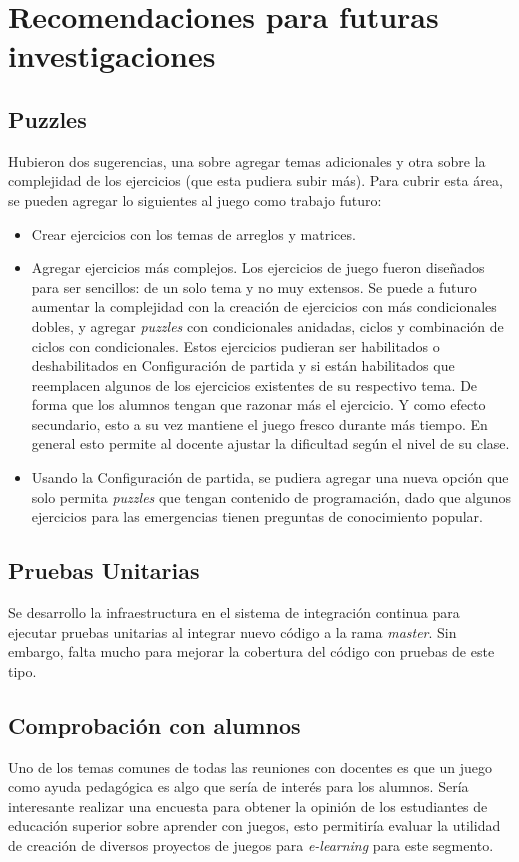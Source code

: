 \section{Recomendaciones para futuras investigaciones}
\subsection{Puzzles}
Hubieron dos sugerencias, una sobre agregar temas adicionales y otra sobre la complejidad de los ejercicios (que esta pudiera subir más). Para cubrir esta área, se pueden agregar lo siguientes al juego como trabajo futuro:
\begin{itemize}
    \item Crear ejercicios con los temas de arreglos y matrices.
    \item Agregar ejercicios más complejos. Los ejercicios de juego fueron diseñados para ser sencillos: de un solo tema y no muy extensos. Se puede a futuro aumentar la complejidad con la creación de ejercicios con más condicionales dobles, y agregar \textit{puzzles} con condicionales anidadas, ciclos y combinación de ciclos con condicionales. Estos ejercicios pudieran ser habilitados o deshabilitados en Configuración de partida y si están habilitados que reemplacen algunos de los ejercicios existentes de su respectivo tema. De forma que los alumnos tengan que razonar más el ejercicio. Y como efecto secundario, esto a su vez mantiene el juego fresco durante más tiempo. En general esto permite al docente ajustar la dificultad según el nivel de su clase.
    \item Usando la Configuración de partida, se pudiera agregar una nueva opción que solo permita \textit{puzzles} que tengan contenido de programación, dado que algunos ejercicios para las emergencias tienen preguntas de conocimiento popular.
\end{itemize}

\subsection{Pruebas Unitarias}
Se desarrollo la infraestructura en el sistema de integración continua para ejecutar pruebas unitarias al integrar nuevo código a la rama \textit{master}. Sin embargo, falta mucho para mejorar la cobertura del código con pruebas de este tipo. 

\subsection{Comprobación con alumnos}
Uno de los temas comunes de todas las reuniones con docentes es que un juego como ayuda pedagógica es algo que sería de interés para los alumnos. Sería interesante realizar una encuesta para obtener la opinión de los estudiantes de educación superior sobre aprender con juegos, esto permitiría evaluar la utilidad de creación de diversos proyectos de juegos para \textit{e-learning} para este segmento. 

